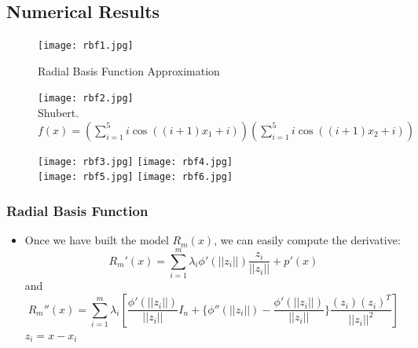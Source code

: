 \documentclass[hyperref={pdfpagelabels=false}]{beamer}
\begin{document}
\subsection{Numerical Results}

\begin{frame}
\begin{figure}
\texttt{[image: rbf1.jpg]}
\caption{Radial Basis Function Approximation}
\end{figure}
\end{frame}


\begin{frame}
\begin{figure}
\texttt{[image: rbf2.jpg]}\\
Shubert.$f(x)=(\sum_{i=1}^5i\cos((i+1)x_1+i))(\sum_{i=1}^5i\cos((i+1)x_2+i))$
\end{figure}
\end{frame}


\begin{frame}[plain]
\begin{figure}
\texttt{[image: rbf3.jpg]}
\texttt{[image: rbf4.jpg]}\\
\texttt{[image: rbf5.jpg]}
\texttt{[image: rbf6.jpg]}
\end{figure}
\end{frame}


\begin{frame}
\frametitle{Radial Basis Function}
\begin{itemize}
\item Once we have built the model $R_m(x)$, we can easily compute the derivative:
\begin{equation}
R_m'(x)=\sum_{i=1}^m\lambda_i\phi'(||z_i||)\frac{z_i}{||z_i||}+p'(x)
\end{equation}
and
\begin{equation}
R_m''(x)=\sum_{i=1}^m\lambda_i\left[\frac{\phi'(||z_i||)}{||z_i||}I_n+\{\phi''(||z_i||)-\frac{\phi'(||z_i||)}{||z_i||}\} \frac{(z_i)(z_i)^T}{||z_i||^2}\right]
\end{equation}
$z_i=x-x_i$
\end{itemize}
\end{frame}
\end{document}
